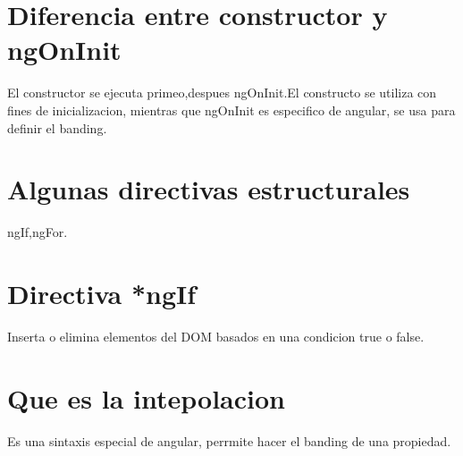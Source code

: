 \section{Diferencia entre constructor y ngOnInit}
El constructor se ejecuta primeo,despues ngOnInit.El constructo se utiliza con fines de inicializacion, mientras que ngOnInit es especifico de angular, se usa para definir el banding.
\section{Algunas directivas estructurales}
ngIf,ngFor.
\section{Directiva *ngIf}
Inserta o elimina elementos del DOM basados en una condicion true o false.
\section{Que es la intepolacion}
Es una sintaxis especial de angular, perrmite hacer el banding de una propiedad{{}}.